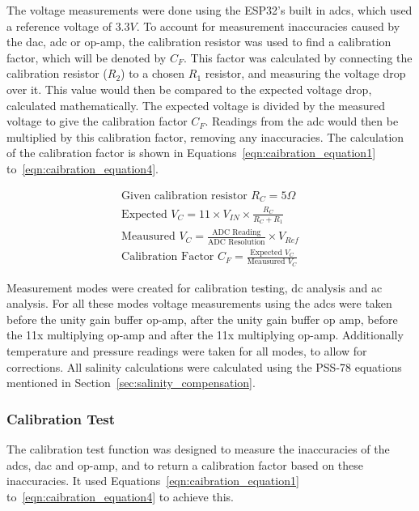 The voltage measurements were done using the ESP32's built in \gls{adc}s, which used a reference voltage of $3.3V$.
To account for measurement inaccuracies caused by the \gls{dac}, \gls{adc} or op-amp, the calibration resistor was used to find a calibration factor, which will be denoted by $C_F$.
This factor was calculated by connecting the calibration resistor ($R_2$) to a chosen $R_1$ resistor, and measuring the voltage drop over it.
This value would then be compared to the expected voltage drop, calculated mathematically.
The expected voltage is divided by the measured voltage to give the calibration factor $C_F$.
Readings from the \gls{adc} would then be multiplied by this calibration factor, removing any inaccuracies.
The calculation of the calibration factor is shown in Equations~\ref{eqn:caibration_equation1} to~\ref{eqn:caibration_equation4}.

\begin{gather}
    \text{Given calibration resistor }R_{C} = 5\Omega \label{eqn:caibration_equation1} \\
    \text{Expected }V_{C} = 11\times V_{IN}\times\frac{R_C}{R_C+R_1} \\
    \text{Meausured }V_{C} = \frac{\text{ADC Reading}}{\text{ADC Resolution}} \times V_{Ref} \\
    \text{Calibration Factor }C_F = \frac{\text{Expected }V_C}{\text{Meausured }V_C} \label{eqn:caibration_equation4}
\end{gather}

Measurement modes were created for calibration testing, \gls{dc} analysis and \gls{ac} analysis.
For all these modes voltage measurements using the \gls{adc}s were taken before the unity gain buffer op-amp, after the unity gain buffer op amp, before the 11x multiplying op-amp and after the 11x multiplying op-amp.
Additionally temperature and pressure readings were taken for all modes, to allow for corrections.
All salinity calculations were calculated using the PSS-78 equations mentioned in Section~\ref{sec:salinity_compensation}.

\subsubsection{Calibration Test}
The calibration test function was designed to measure the inaccuracies of the \gls{adc}s, \gls{dac} and op-amp, and to return a calibration factor based on these inaccuracies.
It used Equations~\ref{eqn:caibration_equation1} to~\ref{eqn:caibration_equation4} to achieve this.

